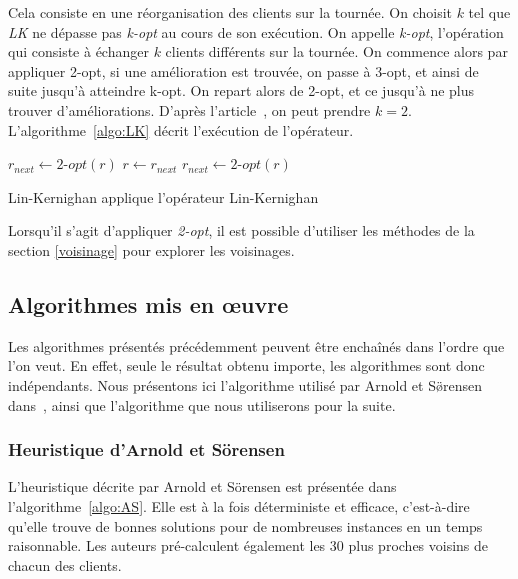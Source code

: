 \documentclass[a4paper,11pt]{article}%
\begin{document}
Cela consiste en une réorganisation des clients sur la tournée. On choisit $k$ tel que \emph{LK} ne dépasse pas \emph{k-opt} au cours de son exécution. 
On appelle \emph{k-opt}, l'opération qui consiste à échanger $k$ clients différents sur la tournée. 
On commence alors par appliquer 2-opt, si une amélioration est trouvée, on passe à 3-opt, et ainsi de suite jusqu'à atteindre k-opt. 
On repart alors de 2-opt, et ce jusqu'à ne plus trouver d'améliorations. 
D'après l'article~\cite{Sorensen_2017}, on peut prendre $k = 2$.
L'algorithme~\ref{algo:LK} décrit l'exécution de l'opérateur.

\begin{algorithm}
\DontPrintSemicolon %
$r_{next} \gets 2$-$opt(r) $\;
 {
  $r \gets r_{next}$\;
  $r_{next} \gets 2$-$opt(r)$\;
}
\;
\caption{{\sc Lin-Kernighan} applique l'opérateur Lin-Kernighan}
\label{algo:LK}
\end{algorithm}

Lorsqu'il s'agit d'appliquer \emph{2-opt}, il est possible d'utiliser les méthodes de la section \ref{voisinage} pour explorer les voisinages.

\subsection{Algorithmes mis en œuvre}
Les algorithmes présentés précédemment peuvent être enchaînés dans l'ordre que l'on veut. 
En effet, seule le résultat obtenu importe, les algorithmes sont donc indépendants. 
Nous présentons ici l'algorithme utilisé par Arnold et S\"\o rensen dans~\cite{Sorensen_2017}, ainsi que l'algorithme que nous utiliserons pour la suite.

\subsubsection{Heuristique d'Arnold et Sörensen}

L'heuristique décrite par Arnold et Sörensen est présentée dans l'algorithme~\ref{algo:AS}. 
Elle est à la fois déterministe et efficace, c'est-à-dire qu'elle trouve de bonnes solutions pour de nombreuses instances en un temps raisonnable. 
Les auteurs pré-calculent également les $30$ plus proches voisins de chacun des clients.
\end{document}
